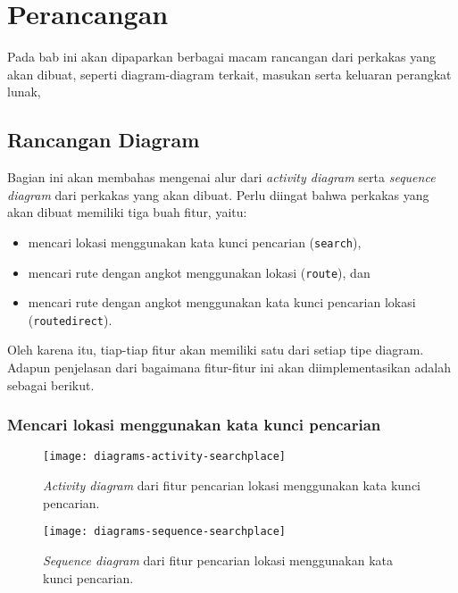 \chapter{Perancangan}
\label{chap:design}

Pada bab ini akan dipaparkan berbagai macam rancangan dari perkakas \cl yang akan dibuat, seperti diagram-diagram terkait, masukan serta keluaran perangkat lunak,

\section{Rancangan Diagram}
\label{sec:design-diagrams}

Bagian ini akan membahas mengenai alur dari \textit{activity diagram} serta \textit{sequence diagram} dari perkakas yang akan dibuat. Perlu diingat bahwa perkakas yang akan dibuat memiliki tiga buah fitur, yaitu:

\begin{itemize}
	\item mencari lokasi menggunakan kata kunci pencarian (\verb|search|),
	\item mencari rute dengan angkot menggunakan \latlon lokasi (\verb|route|), dan
	\item mencari rute dengan angkot menggunakan kata kunci pencarian lokasi (\verb|routedirect|).
\end{itemize}

\noindent
Oleh karena itu, tiap-tiap fitur akan memiliki satu dari setiap tipe diagram. Adapun penjelasan dari bagaimana fitur-fitur ini akan diimplementasikan adalah sebagai berikut.


\subsection{Mencari lokasi menggunakan kata kunci pencarian}
\label{sec:design-diagrams-searchplace}

\begin{figure}[ht]
    \centering
    \texttt{[image: diagrams-activity-searchplace]}
    \caption[Diagram \textit{use case} perkakas yang akan dibangun]{\textit{Activity diagram} dari fitur pencarian lokasi menggunakan kata kunci pencarian.}
    \label{fig:diagrams-activity-direct}
\end{figure}

\begin{figure}[ht]
    \centering
    \texttt{[image: diagrams-sequence-searchplace]}
    \caption[Diagram \textit{use case} perkakas yang akan dibangun]{\textit{Sequence diagram} dari fitur pencarian lokasi menggunakan kata kunci pencarian.}
    \label{fig:diagrams-sequence-direct}
\end{figure}

